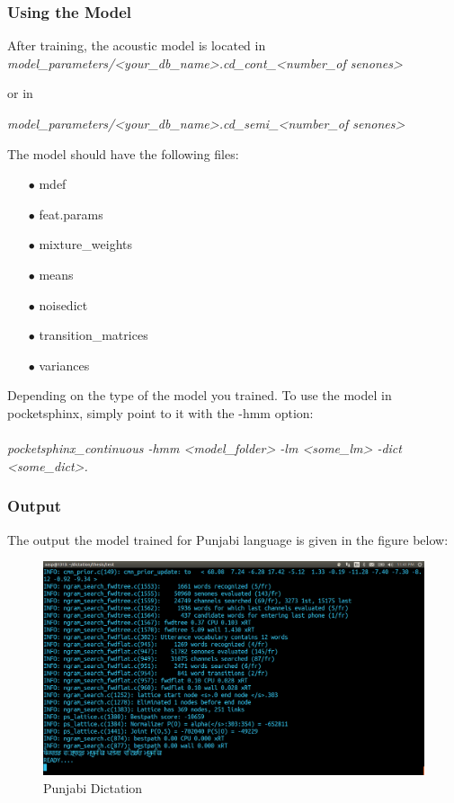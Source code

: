 \documentclass[12pt,a4paper,oneside]{memoir}
\begin{document}
\subsubsection{Using the Model}
After training, the acoustic model is located in \\

\textit{model\_parameters/<your\_db\_name>.cd\_cont\_<number\_of senones>}

or in 

\textit{model\_parameters/<your\_db\_name>.cd\_semi\_<number\_of senones>}

The model should have the following files:
\begin{itemize}
	\item[$\bullet$] mdef
	\item[$\bullet$] feat.params
	\item[$\bullet$]mixture\_weights
	\item[$\bullet$]means
	\item[$\bullet$]noisedict
	\item[$\bullet$]transition\_matrices
	\item[$\bullet$]variances
\end{itemize}

Depending on the type of the model you trained. To use the model in pocketsphinx, simply point to it with the -hmm option: \\\\

\textit{pocketsphinx\_continuous -hmm <model\_folder> -lm <some\_lm> -dict <some\_dict>.}

\subsubsection{Output}

The output the model trained for Punjabi language is given in the figure below:



\begin{figure}[h]
    \centering
    \includegraphics[scale=0.3]{Screenshot5}
    \caption{Punjabi Dictation}
\end{figure}
\end{document}
